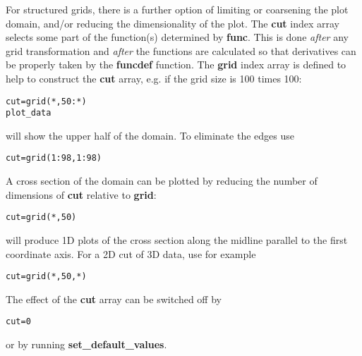 \documentclass{article}
\begin{document}
   For structured grids, there is a further option of limiting or coarsening
   the plot domain, and/or reducing the dimensionality of the plot.
   The {\bf cut} index array selects some part of the function(s)
   determined by {\bf func}.
   This is done {\em after} any grid transformation and {\em after} 
   the functions are calculated so that derivatives can be properly taken 
   by the {\bf funcdef} function.
   The {\bf grid} index array is defined to help to construct
   the {\bf cut} array, e.g. if the grid size is 100 times 100:
\begin{verbatim}
cut=grid(*,50:*)
plot_data
\end{verbatim}
   will show the upper half of the domain. To eliminate the edges use
\begin{verbatim}
cut=grid(1:98,1:98)
\end{verbatim}
   A cross section of the domain can be plotted by reducing
   the number of dimensions of {\bf cut} relative to {\bf grid}:
\begin{verbatim}
cut=grid(*,50)
\end{verbatim}
   will produce 1D plots of the cross section along the midline parallel to 
   the first coordinate axis. For a 2D cut of 3D data, use for example
\begin{verbatim}
cut=grid(*,50,*)
\end{verbatim}
   The effect of the {\bf cut} array can be switched off by 
\begin{verbatim}
cut=0
\end{verbatim}
   or by running {\bf set\_default\_values}.
\end{document}
